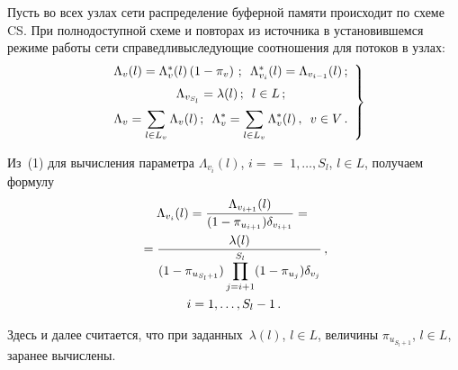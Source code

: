 \begin{multicols}{2}
     Пусть во всех узлах сети распределение бу\-ферной памяти происходит по 
схеме CS. При пол\-нодоступной схеме и повторах из источника в 
установившемся режиме работы сети справедливы\linebreak следующие соотношения 
для потоков в узлах:
     \begin{equation}
     \left.
     \begin{array}{c}
     \Lambda_v(l) =\Lambda_v^*(l)\left (1-\pi_v\right )\,;\enskip
     \Lambda^*_{v_i}(l) =\Lambda_{v_{i-1}}(l)\,;\\[6pt]
     \Lambda_{v_{S_l}} =\lambda(l)\,;\enskip l\in L\,;\\[6pt]
     \Lambda_v  =\displaystyle\sum\limits_{l\in L_v}\Lambda_v(l)\,;\enskip 
\Lambda_v^*=\displaystyle\sum\limits_{l\in L_v}\Lambda_v^*(l)\,,\enskip v\in V\,.
\end{array}
\right \}\!\!
     \end{equation}
     
     Из~(1) для вычисления параметра $\Lambda_{v_i}(l)$, $i=$\linebreak $=\;1,\ldots ,S_l$, 
$l\in L$, получаем формулу
     \begin{multline}
     \Lambda_{v_i}(l) =\displaystyle\frac{\displaystyle \Lambda_{v_{i+1}}(l)\mathstrut}{\displaystyle (1-
\pi_{u_{i+1}})\delta_{v_{i+1}}\mathstrut} ={}\\
{}=\displaystyle\frac{\displaystyle \lambda(l)\mathstrut}{\displaystyle (1-
\pi_{u_{S_l+1}})\prod\limits_{j=i+1}^{S_l} (1-\pi_{u_j})\delta_{v_j}\mathstrut}\,,\\
i=1,\ldots  ,S_l-1\,.
     \end{multline}
     
     Здесь и далее считается, что при заданных~$\lambda(l)$, 
$l\in L$, величины $\pi_{u_{S_l+1}}$, $l\in L$, заранее вы\-чис\-лены.
     

\end{multicols}
